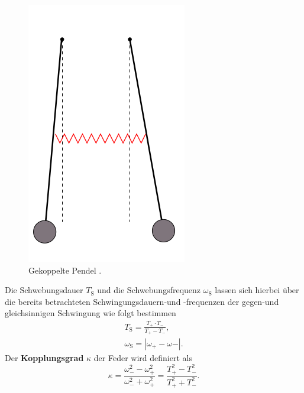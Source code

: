 \begin{figure}
	\centering
	\includegraphics[width=0.4\linewidth]{Bilder/gekoppelt.png}
	\caption{Gekoppelte Pendel \cite{Anleitung}.}
	\label{fig:schwebe}

\end{figure}
\FloatBarrier
Die Schwebungsdauer $T_{\mathrm{S}}$ und die Schwebungsfrequenz $\omega_{\mathrm{S}}$ lassen sich hierbei über die bereits betrachteten Schwingungsdauern-und -frequenzen der gegen-und gleichsinnigen Schwingung wie folgt bestimmen
\begin{gather}
	\label{eqn:twschwebe}
	T_{\mathrm{S}}=\frac{T_{\mathrm{+}}\cdot T_{\mathrm{-}}}{T_{\mathrm{+}}-T_{\mathrm{-}}} \text{,}\\
	\omega_{\mathrm{S}}=|\omega_{\mathrm{+}}-\omega{\mathrm{-}}| \text{.}
\end{gather}
Der \textbf{Kopplungsgrad} $\kappa$ der Feder wird definiert als
\begin{equation}
	\label{eqn:kappa}
	\kappa=\frac{\omega_{\mathrm{-}}^2-\omega_{\mathrm{+}}^2}{\omega_{\mathrm{-}}^2+\omega_{\mathrm{+}}^2}=\frac{T_{\mathrm{+}}^2-T_{\mathrm{-}}^2}{T_{\mathrm{+}}^2+T_{\mathrm{-}}^2} \text{.}
\end{equation}
